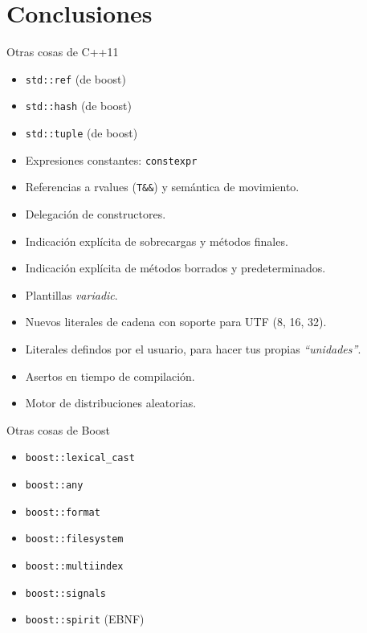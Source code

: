 \documentclass[8pt,xcolor=svgnames]{beamer}
\begin{document}

\section{Conclusiones}

\begin{frame}{Otras cosas de C++11}
  \begin{itemize}
  \item \texttt{std::ref} (de boost)
  \item \texttt{std::hash} (de boost)
  \item \texttt{std::tuple} (de boost)
  \item Expresiones constantes: \texttt{constexpr}
  \item Referencias a rvalues (\texttt{T\&\&}) y semántica de movimiento.
  \item Delegación de constructores.
  \item Indicación explícita de sobrecargas y métodos finales.
  \item Indicación explícita de métodos borrados y predeterminados.
  \item Plantillas \textit{variadic}.
  \item Nuevos literales de cadena con soporte para UTF (8, 16, 32).
  \item Literales defindos por el usuario, para hacer tus propias \textit{``unidades''}.
  \item Asertos en tiempo de compilación.
  \item Motor de distribuciones aleatorias.
  \end{itemize}  
\end{frame}

\begin{frame}{Otras cosas de Boost}
  \begin{itemize}
  \item \texttt{boost::lexical\_cast}
  \item \texttt{boost::any}
  \item \texttt{boost::format}
  \item \texttt{boost::filesystem}
  \item \texttt{boost::multiindex}
  \item \texttt{boost::signals}
  \item \texttt{boost::spirit} (EBNF)
  \end{itemize}  
\end{frame}
\end{document}
